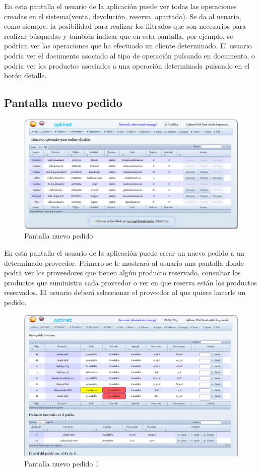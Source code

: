 \documentclass[a4paper,11pt]{book}
\begin{document}
En esta pantalla el usuario de la aplicación puede ver todas las operaciones creadas en el sistema(venta, devolución, reserva, apartado). Se da al usuario, como siempre, la posibilidad para realizar los filtrados que son necesarios para realizar búsquedas y también indicar que en esta pantalla, por ejemplo, se podrían ver las operaciones que ha efectuado un cliente determinado. El usuario podría ver el documento asociado al tipo de operación pulsando en documento, o podría ver los productos asociados a una operación determinada pulsando en el botón detalle.

\newpage
\subsection {Pantalla nuevo pedido}

\begin{figure}[!htb]
  \centering
    \includegraphics[scale=0.35]{capnuevopedido.png}
  \caption{Pantalla nuevo pedido}
  \label{a}
\end{figure}

En esta pantalla el usuario de la aplicación puede crear un nuevo pedido a un determinado proveedor. Primero se le mostrará al usuario una pantalla donde podrá ver los proveedores que tienen algún producto reservado, consultar los productos que suministra cada proveedor o ver en que reserva están los productos reservados. El usuario deberá seleccionar el proveedor al que quiere hacerle un pedido. 

\newpage
\begin{figure}[!htb]
  \centering
    \includegraphics[scale=0.35]{capnuevopedido1.png}
  \caption{Pantalla nuevo pedido 1}
  \label{a}
\end{figure}
\end{document}
